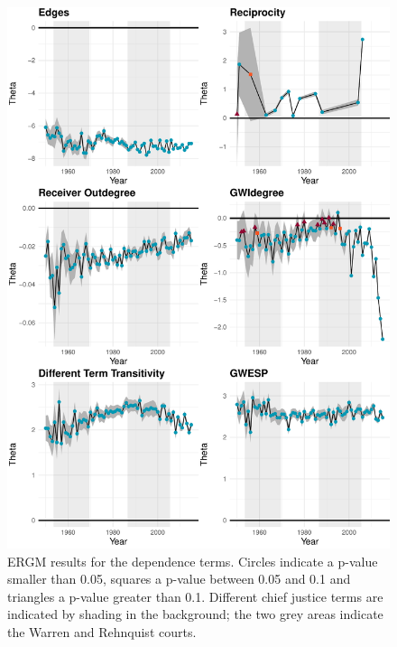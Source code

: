 \documentclass[headsepline=true, abstracton]{scrartcl}
\begin{document}
\begin{figure}
	\centering
	\includegraphics[width=14cm ]{SCC_results_1.pdf}
	\caption{ERGM results for the dependence terms. Circles indicate a p-value smaller than 0.05, squares a p-value between 0.05 and 0.1 and triangles a p-value greater than 0.1. Different chief justice terms are indicated by shading in the background; the two grey areas indicate the Warren and Rehnquist courts.}
	\label{SCC_results_1}
\end{figure}
\end{document}
